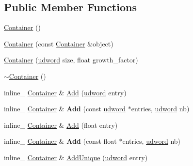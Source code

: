 \subsection*{Public Member Functions}
\begin{DoxyCompactItemize}
\item 
\hyperlink{classContainer_a1b0c5515d6863c1bc98cc93b65952f42}{Container} ()
\item 
\hyperlink{classContainer_a38b2b6815b1dbcb61c255aa4b0c6549d}{Container} (const \hyperlink{classContainer}{Container} \&object)
\item 
\hyperlink{classContainer_a357a6c570a212995f29e0c161d0bdedd}{Container} (\hyperlink{IceTypes_8h_a44c6f1920ba5551225fb534f9d1a1733}{udword} size, float growth\+\_\+factor)
\item 
\hyperlink{classContainer_ae9f5d07bfc3defda274aa06091c19f56}{$\sim$\+Container} ()
\item 
inline\+\_\+ \hyperlink{classContainer}{Container} \& \hyperlink{classContainer_ab02175b19abdd65e70e2ac36c4d098ab}{Add} (\hyperlink{IceTypes_8h_a44c6f1920ba5551225fb534f9d1a1733}{udword} entry)
\item 
inline\+\_\+ \hyperlink{classContainer}{Container} \& {\bfseries Add} (const \hyperlink{IceTypes_8h_a44c6f1920ba5551225fb534f9d1a1733}{udword} $\ast$entries, \hyperlink{IceTypes_8h_a44c6f1920ba5551225fb534f9d1a1733}{udword} nb)\hypertarget{classContainer_a8efe7e32963cd5708b2ff5ec44218b09}{}\label{classContainer_a8efe7e32963cd5708b2ff5ec44218b09}

\item 
inline\+\_\+ \hyperlink{classContainer}{Container} \& \hyperlink{classContainer_a405dd927b0f31f5d4b1307c6f17cd044}{Add} (float entry)
\item 
inline\+\_\+ \hyperlink{classContainer}{Container} \& {\bfseries Add} (const float $\ast$entries, \hyperlink{IceTypes_8h_a44c6f1920ba5551225fb534f9d1a1733}{udword} nb)\hypertarget{classContainer_a73c097e99165dc065ef121fd42017424}{}\label{classContainer_a73c097e99165dc065ef121fd42017424}

\item 
inline\+\_\+ \hyperlink{classContainer}{Container} \& \hyperlink{classContainer_a8c6620607260e093f00238b12d2aac5a}{Add\+Unique} (\hyperlink{IceTypes_8h_a44c6f1920ba5551225fb534f9d1a1733}{udword} entry)\hypertarget{classContainer_a8c6620607260e093f00238b12d2aac5a}{}\label{classContainer_a8c6620607260e093f00238b12d2aac5a}


\end{DoxyCompactItemize}
